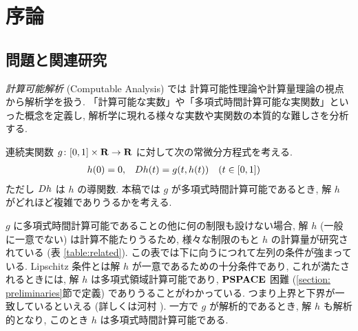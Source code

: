 \section{序論}

\subsection{問題と関連研究}

\emph{計算可能解析} (Computable Analysis) \cite{weihrauch00:_comput_analy} では
計算可能性理論や計算量理論の視点から解析学を扱う. 
「計算可能な実数」や「多項式時間計算可能な実関数」といった概念を定義し, 
解析学に現れる様々な実数や実関数の本質的な難しさを分析する. 

連続実関数 $g \colon [0,1] \times \mathbf R \to \mathbf R$ に対して次の常微分方程式を考える. 
\begin{align}
 \label{eq:ode}
 h(0) & = 0, &
 D h(t) & = g(t,h(t)) \quad (t \in [0,1])
\end{align}
ただし $D h$ は $h$ の導関数.
本稿では $g$ が多項式時間計算可能であるとき, 
解 $h$ がどれほど複雑でありうるかを考える.


$g$ に多項式時間計算可能であることの他に何の制限も設けない場合, 
解 $h$ (一般に一意でない) は計算不能たりうるため,
様々な制限のもと $h$ の計算量が研究されている (表 \ref{table:related}).
この表では下に向うにつれて左列の条件が強まっている. 
Lipschitz 条件とは解 $h$ が一意であるための十分条件であり, 
これが満たされるときには, 解 $h$ は多項式領域計算可能であり, 
$\mathbf{PSPACE}$ 困難 (\ref{section: preliminaries}節で定義) でありうることがわかっている. 
つまり上界と下界が一致しているといえる (詳しくは河村 \cite{kawamura2010lipschitz}).
一方で $g$ が解析的であるとき, 解 $h$ も解析的となり, 
このとき $h$ は多項式時間計算可能である.


